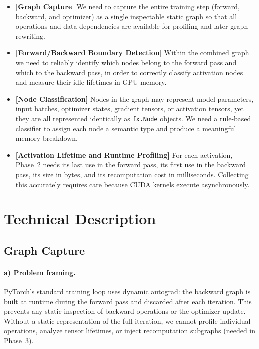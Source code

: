 \documentclass[11pt]{article}
\begin{document}
\begin{itemize}[leftmargin=*]

  \item \textbf{[Graph Capture]}
    We need to capture the entire training step (forward, backward,
    and optimizer) as a single inspectable static graph so that all
    operations and data dependencies are available for profiling and
    later graph rewriting.

  \item \textbf{[Forward/Backward Boundary Detection]}
    Within the combined graph we need to reliably identify which nodes
    belong to the forward pass and which to the backward pass, in order
    to correctly classify activation nodes and measure their idle
    lifetimes in GPU memory.

  \item \textbf{[Node Classification]}
    Nodes in the graph may represent model parameters, input batches,
    optimizer states, gradient tensors, or activation tensors, yet they
    are all represented identically as \texttt{fx.Node} objects.
    We need a rule-based classifier to assign each node a semantic type
    and produce a meaningful memory breakdown.

  \item \textbf{[Activation Lifetime and Runtime Profiling]}
    For each activation, Phase~2 needs its last use in the forward pass,
    its first use in the backward pass, its size in bytes, and its
    recomputation cost in milliseconds.
    Collecting this accurately requires care because CUDA kernels execute
    asynchronously.

\end{itemize}

\section{Technical Description}

\subsection{Graph Capture}

\paragraph{a) Problem framing.}
PyTorch's standard training loop uses dynamic autograd: the backward
graph is built at runtime during the forward pass and discarded after
each iteration.
This prevents any static inspection of backward operations or the
optimizer update.
Without a static representation of the full iteration, we cannot profile
individual operations, analyze tensor lifetimes, or inject recomputation
subgraphs (needed in Phase~3).
\end{document}
